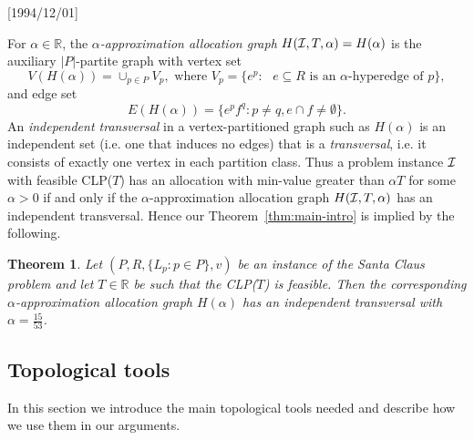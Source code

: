 \NeedsTeXFormat{LaTeX2e}[1994/12/01]\documentclass[letterpaper, 11pt]{article}
\newtheorem{thm}{Theorem}[section]
\theoremstyle{definition}
\theoremstyle{remark}
\numberwithin{equation}{section}
\begin{document}
For $\alpha \in \mathbb{R}$,
the {\em $\alpha$-approximation allocation graph} 
$H({\cal I}, T, \alpha) = H(\alpha)$ is the auxiliary $|P|$-partite
graph with vertex set
$$V(H(\alpha)) = \cup_{p\in P} V_p, \mbox{ where } V_p = \{ e^p : \mbox{ $e
  \subseteq R$ is an
  $\alpha$-hyperedge of $p$} \},$$
and edge set 
$$E(H(\alpha)) = \{e^pf^q: p\neq q,  e\cap f \neq \emptyset \}.$$
An {\em independent transversal} in a vertex-partitioned graph such as
$H(\alpha)$ is an independent set (i.e. one that induces no edges)
that is a {\em transversal}, i.e. it 
consists of exactly one vertex in each partition class. Thus a
problem instance ${\cal I}$ with feasible CLP($T$) has an
allocation with min-value greater than $\alpha T$ for some $\alpha >0$
if and only if the $\alpha$-approximation allocation graph
$H({\cal I}, T, \alpha)$ has an independent transversal.  
Hence our Theorem~\ref{thm:main-intro} is implied by the following.

\begin{thm}\label{thm:main} Let $( P , R, \{ L_p: p\in P \}, v)$
  be an instance of the Santa Claus
  problem and let $T\in \mathbb{R}$ be such that the CLP($T$) is feasible.
  Then the corresponding $\alpha$-approximation allocation graph
  $H(\alpha)$ has an independent transversal with $\alpha = \frac{15}{53}$. 
\end{thm}


\subsection{Topological tools} \label{sec:topological}
In this section we introduce the main topological tools needed and
 describe how we use them in our arguments. 
 
\end{document}
